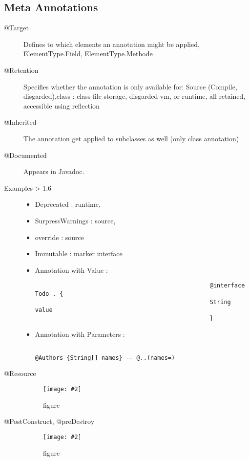 \documentclass[a4paper,10pt]{scrreprt}
\newcommand{\pic}[2][figure]{\begin{figure}[h]
 \centering
 \texttt{[image: \#2]}
 \caption{#1}
\end{figure}
}
\begin{document}
\subsection{Meta Annotations}
\begin{description}
 \item [@Target] Defines to which elements an annotation might be applied, ElementType.Field, ElementType.Methode
 \item [@Retention] Specifies whether the annotation is only available for: Source (Compile, disgarded),class : class 
file storage, disgarded vm, or 	runtime, all retained, accessible using reflection
\item [@Inherited] The annotation get applied to subclasses as well (only class
annotation)
\item [@Documented] Appears in Javadoc.
\item [Examples > 1.6] \begin{itemize}
                  \item Deprecated : runtime, 
                  \item SurpressWarnings : source,
                  \item override : source
                  \item Immutable : marker interface
                  \item Annotation with Value : \begin{verbatim}
                                                  @interface Todo . {
                                                  String value
                                                  }
                                                \end{verbatim}	
                  \item Annotation with Parameters : \begin{verbatim}
                                                      @Authors {String[] names} -- @..(names=)
                                                     \end{verbatim} 


                 \end{itemize}
\item[@Resource] \pic{resc.png}
\item [@PostConstruct, @preDestroy] \pic{pcnst.png}
\end{description}
\end{document}
